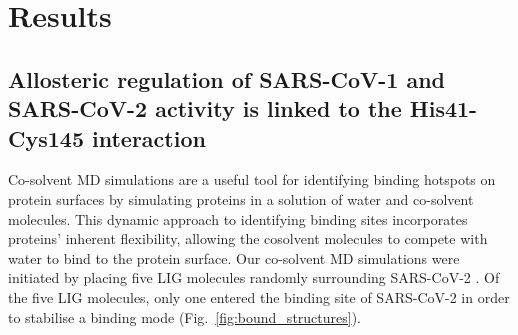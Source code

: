 \section*{Results}
%
\subsection*{Allosteric regulation of SARS-CoV-1 and SARS-CoV-2 \mpro activity is linked to the His41-Cys145 interaction}

Co-solvent MD simulations \cite{seco2009binding} are a useful tool for identifying binding hotspots on protein surfaces by simulating proteins in a solution of water and co-solvent molecules. This dynamic approach to identifying binding sites incorporates proteins' inherent flexibility, allowing the cosolvent molecules to compete with water to bind to the protein surface.\cite{ghanakota2016driving} Our co-solvent MD simulations were initiated by placing five LIG molecules randomly surrounding SARS-CoV-2 \mpro. Of the five LIG molecules, only one entered the binding site of SARS-CoV-2 in order to stabilise a binding mode (Fig.~\ref{fig:bound_structures}). \\

